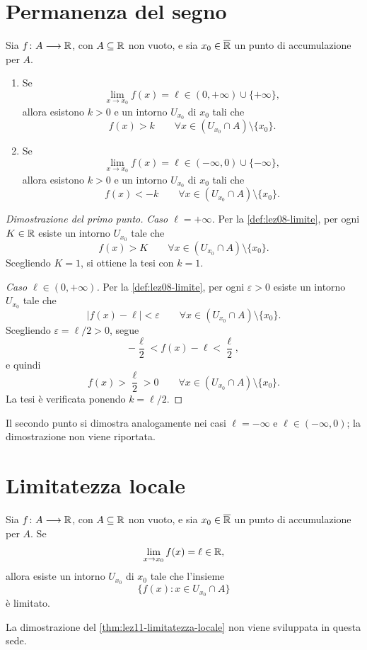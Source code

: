 \section{Permanenza del segno}
\label{sec:lez11-permanenza-segno}

\begin{theorem}
\label{thm:lez11-permanenza-segno}
Sia \(f\colon A\longrightarrow\mathbb{R}\), con \(A\subseteq\mathbb{R}\)
non vuoto, e sia \(x_0\in\overline{\mathbb{R}}\) un punto di
accumulazione per \(A\).
\begin{enumerate}
  \item Se
  \[
    \lim_{x\to x_0}f(x)=\ell
    \in(0,+\infty)\cup\{+\infty\},
  \]
  allora esistono \(k>0\) e un intorno \(U_{x_0}\)
  di \(x_0\) tali che
  \[
    f(x)>k
    \qquad\forall x\in(U_{x_0}\cap A)\setminus\{x_0\}.
  \]
  \item Se
  \[
    \lim_{x\to x_0}f(x)=\ell
    \in(-\infty,0)\cup\{-\infty\},
  \]
  allora esistono \(k>0\) e un intorno \(U_{x_0}\)
  di \(x_0\) tali che
  \[
    f(x)<-k
    \qquad\forall x\in(U_{x_0}\cap A)\setminus\{x_0\}.
  \]
\end{enumerate}
\end{theorem}

\begin{proof}[Dimostrazione del primo punto]
\emph{Caso \(\ell=+\infty\).}
Per la \cref{def:lez08-limite}, per ogni \(K\in\mathbb{R}\)
esiste un intorno \(U_{x_0}\) tale che
\[
  f(x)>K
  \qquad\forall x\in(U_{x_0}\cap A)\setminus\{x_0\}.
\]
Scegliendo \(K=1\), si ottiene la tesi con \(k=1\).

\emph{Caso \(\ell\in(0,+\infty)\).}
Per la \cref{def:lez08-limite}, per ogni
\(\varepsilon>0\) esiste un intorno \(U_{x_0}\)
tale che
\[
  |f(x)-\ell|<\varepsilon
  \qquad\forall x\in(U_{x_0}\cap A)\setminus\{x_0\}.
\]
Scegliendo \(\varepsilon=\ell/2>0\), segue
\[
  -\frac\ell2<f(x)-\ell<\frac\ell2,
\]
e quindi
\[
  f(x)>\frac\ell2>0
  \qquad\forall x\in(U_{x_0}\cap A)\setminus\{x_0\}.
\]
La tesi è verificata ponendo \(k=\ell/2\).
\end{proof}

Il secondo punto si dimostra analogamente nei casi
\(\ell=-\infty\) e \(\ell\in(-\infty,0)\);
la dimostrazione non viene riportata.

\section{Limitatezza locale}
\label{sec:lez11-limitatezza-locale}

\begin{theorem}
\label{thm:lez11-limitatezza-locale}
Sia \(f\colon A\longrightarrow\mathbb{R}\), con \(A\subseteq\mathbb{R}\)
non vuoto, e sia \(x_0\in\overline{\mathbb{R}}\) un punto di
accumulazione per \(A\). Se
\[
  \lim_{x\to x_0}f(x)=\ell\in\mathbb{R},
\]
allora esiste un intorno \(U_{x_0}\) di \(x_0\)
tale che l'insieme
\[
  \{f(x):x\in U_{x_0}\cap A\}
\]
è limitato.
\end{theorem}

La dimostrazione del \cref{thm:lez11-limitatezza-locale}
non viene sviluppata in questa sede.
